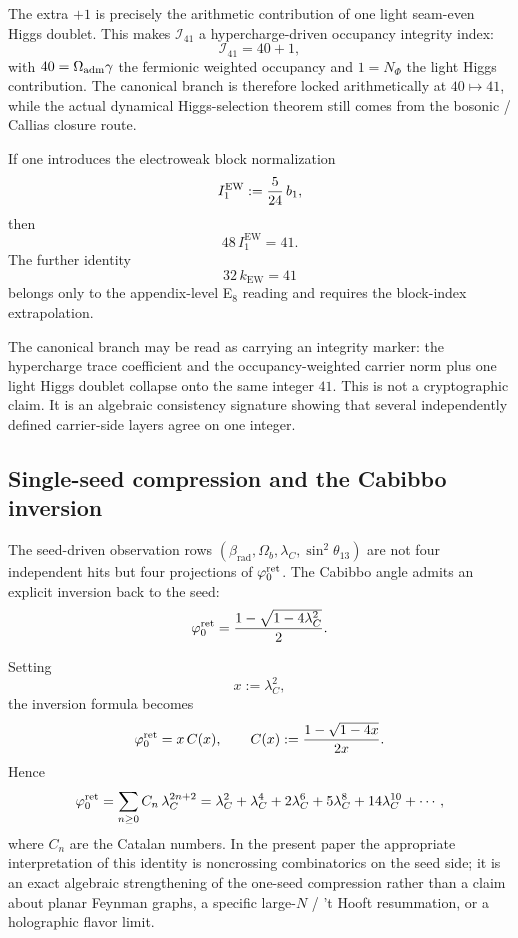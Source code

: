 The extra $+1$ is precisely the arithmetic contribution of one light seam-even Higgs doublet. This makes $\mathcal I_{41}$ a hypercharge-driven occupancy integrity index:
\[
\mathcal I_{41}=40+1,
\]
with $40=\Omega_{\mathrm{adm}}\gamma$ the fermionic weighted occupancy and $1=N_\Phi$ the light Higgs contribution. The canonical branch is therefore locked arithmetically at $40\mapsto 41$, while the actual dynamical Higgs-selection theorem still comes from the bosonic / Callias closure route.

\begin{remark}
If one introduces the electroweak block normalization
\[
I_1^{\mathrm{EW}}:=\frac{5}{24}\,b_1,
\]
then
\[
48\,I_1^{\mathrm{EW}}=41.
\]
The further identity
\[
32\,k_{\mathrm{EW}}=41
\]
belongs only to the appendix-level E$_8$ reading and requires the block-index extrapolation.
\end{remark}

\begin{remark}
The canonical branch may be read as carrying an integrity marker: the hypercharge trace coefficient and the occupancy-weighted carrier norm plus one light Higgs doublet collapse onto the same integer $41$. This is not a cryptographic claim. It is an algebraic consistency signature showing that several independently defined carrier-side layers agree on one integer.
\end{remark}

\subsection{Single-seed compression and the Cabibbo inversion}

The seed-driven observation rows $(\beta_{\mathrm{rad}},\Omega_b,\lambda_C,\sin^2\theta_{13})$
are not four independent hits but four projections of $\varphi_0^{\mathrm{ret}}$. The Cabibbo angle admits an
explicit inversion back to the seed:
\begin{equation}
\label{eq:cabibbo-inversion}
\varphi_0^{\mathrm{ret}}=\frac{1-\sqrt{1-4\lambda_C^2}}{2}.
\end{equation}
\begin{remark}
Setting
\[
x:=\lambda_C^2,
\]
the inversion formula becomes
\[
\varphi_0^{\mathrm{ret}}=x\,C(x),
\qquad
C(x):=\frac{1-\sqrt{1-4x}}{2x}.
\]
Hence
\begin{equation}
\label{eq:catalan-cabibbo}
\varphi_0^{\mathrm{ret}}
=
\sum_{n\ge 0} C_n\,\lambda_C^{2n+2}
=
\lambda_C^2+\lambda_C^4+2\lambda_C^6+5\lambda_C^8+14\lambda_C^{10}+\cdots,
\end{equation}
where $C_n$ are the Catalan numbers. In the present paper the appropriate interpretation of this
identity is noncrossing combinatorics on the seed side; it is an exact algebraic strengthening of
the one-seed compression rather than a claim about planar Feynman graphs, a specific large-$N$ /
't Hooft resummation, or a holographic flavor limit.
\end{remark}

